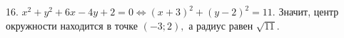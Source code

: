 16. $x^2+y^2+6x-4y+2=0\Leftrightarrow (x+3)^2+(y-2)^2=11.$ Значит, центр окружности находится в точке $(-3;2),$ а радиус равен $\sqrt{11}.$\\
